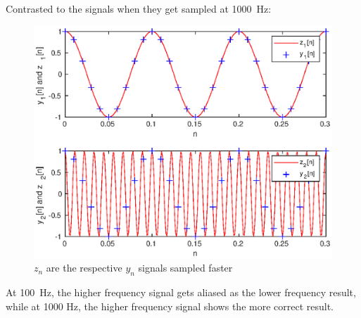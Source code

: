 \documentclass{article}
\begin{document}
\begin{multicols}{2}
    Contrasted to the signals when they get sampled at \SI{1000}{\hertz}:
    \begin{figure}[H]
        \centering
        \includegraphics[width=\linewidth]{plot5}
        \caption{\(z_n\) are the respective \(y_n\) signals sampled faster}
    \end{figure}

    At \SI{100}{\hertz}, the higher frequency signal gets aliased as the lower frequency result, while at 1000 Hz, the higher frequency signal shows the more correct result.


\end{multicols}
\end{document}
